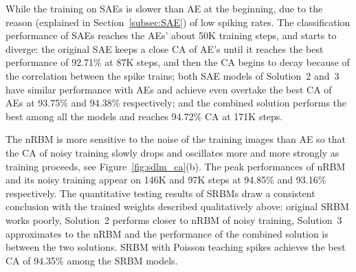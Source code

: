 While the training on SAEs is slower than AE at the beginning, due to the reason (explained in Section~\ref{subsec:SAE}) of low spiking rates.
The classification performance of SAEs reaches the AEs' about 50K training steps, and starts to diverge:
the original SAE keeps a close CA of AE's until it reaches the best performance of 92.71\% at 87K steps, and then the CA begins to decay because of the correlation between the spike trains;
both SAE models of Solution~2 and~3 have similar performance with AEs and achieve even overtake the best CA of AEs at 93.75\% and 94.38\% respectively;
and the combined solution performs the best among all the models and reaches 94.72\% CA at 171K steps.

The nRBM is more sensitive to the noise of the training images than AE so that the CA of noisy training slowly drops and oscillates more and more strongly as training proceeds, see Figure~\ref{fig:sdlm_ca}(b).
The peak performances of nRBM and its noisy training appear on 146K and 97K steps at 94.85\% and 93.16\% respectively. 
The quantitative testing results of SRBMs draw a consistent conclusion with the trained weights described qualitatively above:
original SRBM works poorly, Solution~2 performs closer to nRBM of noisy training, Solution~3 approximates to the nRBM and the performance of the combined solution is between the two solutions.
SRBM with Poisson teaching spikes achieves the best CA of 94.35\% among the SRBM models.


